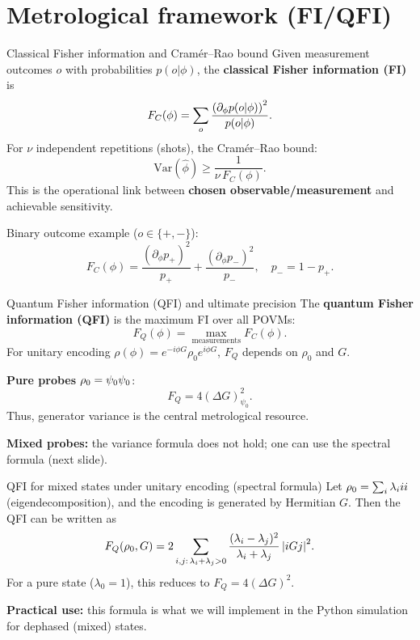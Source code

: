 \documentclass[aspectratio=169]{beamer}
\let\bra\relax \let\ket\relax \let\braket\relax
\begin{document}
\section{Metrological framework (FI/QFI)}

\begin{frame}{Classical Fisher information and Cram\'er--Rao bound}
\small
Given measurement outcomes $o$ with probabilities $p(o|\phi)$, the \textbf{classical Fisher information (FI)} is
\[
F_C(\phi)=\sum_o \frac{\qty(\partial_\phi p(o|\phi))^2}{p(o|\phi)}.
\]
For $\nu$ independent repetitions (shots), the Cram\'er--Rao bound:
\[
\mathrm{Var}(\hat\phi) \ge \frac{1}{\nu\,F_C(\phi)}.
\]
This is the operational link between \textbf{chosen observable/measurement} and achievable sensitivity. \citep{Paris2009IJQI}

\vspace{0.35em}
Binary outcome example ($o\in\{+,-\}$):
\[
F_C(\phi)=\frac{(\partial_\phi p_+)^2}{p_+}+\frac{(\partial_\phi p_-)^2}{p_-},\quad p_-=1-p_+.
\]
\end{frame}

\begin{frame}{Quantum Fisher information (QFI) and ultimate precision}
\small
The \textbf{quantum Fisher information (QFI)} is the maximum FI over all POVMs:
\[
F_Q(\phi)=\max_{\text{measurements}} F_C(\phi).
\]
For unitary encoding $\rho(\phi)=e^{-i\phi G}\rho_0 e^{i\phi G}$, $F_Q$ depends on $\rho_0$ and $G$. \citep{BraunsteinCaves1994PRL,Paris2009IJQI}

\vspace{0.35em}
\textbf{Pure probes} $\rho_0=\ket{\psi_0}\bra{\psi_0}$:
\[
\boxed{F_Q = 4(\Delta G)^2_{\psi_0}}.
\]
Thus, generator variance is the central metrological resource. \citep{Pezze2018RMP,Giovannetti2011NatPhoton}

\vspace{0.35em}
\textbf{Mixed probes:} the variance formula does not hold; one can use the spectral formula (next slide).
\end{frame}

\begin{frame}{QFI for mixed states under unitary encoding (spectral formula)}
\small
Let $\rho_0=\sum_i \lambda_i \ket{i}\bra{i}$ (eigendecomposition), and the encoding is generated by Hermitian $G$.
Then the QFI can be written as \citep{BraunsteinCaves1994PRL,Paris2009IJQI}
\[
F_Q(\rho_0,G)
=
2\sum_{i,j:\,\lambda_i+\lambda_j>0}
\frac{(\lambda_i-\lambda_j)^2}{\lambda_i+\lambda_j}\,
\abs{\bra{i}G\ket{j}}^2.
\]
For a pure state ($\lambda_0=1$), this reduces to $F_Q=4(\Delta G)^2$.

\vspace{0.35em}
\textbf{Practical use:}
this formula is what we will implement in the Python simulation for dephased (mixed) states.
\end{frame}
\end{document}
